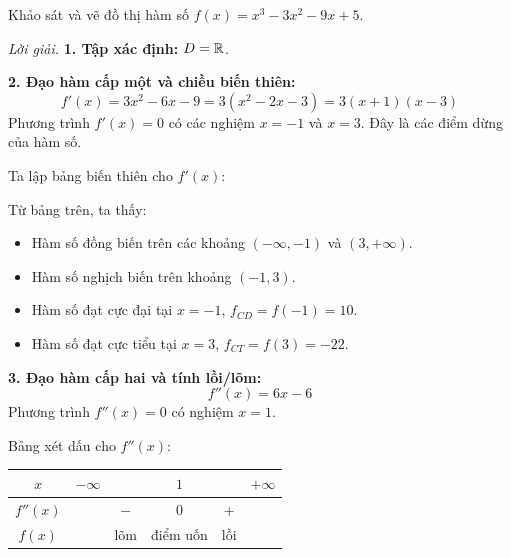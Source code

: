 \begin{example}
Khảo sát và vẽ đồ thị hàm số $f(x) = x^3 - 3x^2 - 9x + 5$.

\textit{Lời giải.}
\textbf{1. Tập xác định:} $D = \mathbb{R}$.

\textbf{2. Đạo hàm cấp một và chiều biến thiên:}
$$ f'(x) = 3x^2 - 6x - 9 = 3(x^2 - 2x - 3) = 3(x+1)(x-3) $$
Phương trình $f'(x)=0$ có các nghiệm $x=-1$ và $x=3$. Đây là các điểm dừng của hàm số.

Ta lập bảng biến thiên cho $f'(x)$:

\begin{center}
\end{center}

Từ bảng trên, ta thấy:
\begin{itemize}
    \item Hàm số đồng biến trên các khoảng $(-\infty, -1)$ và $(3, +\infty)$.
    \item Hàm số nghịch biến trên khoảng $(-1, 3)$.
    \item Hàm số đạt cực đại tại $x=-1$, $f_{CD} = f(-1) = 10$.
    \item Hàm số đạt cực tiểu tại $x=3$, $f_{CT} = f(3) = -22$.
\end{itemize}

\textbf{3. Đạo hàm cấp hai và tính lồi/lõm:}
$$ f''(x) = 6x - 6 $$
Phương trình $f''(x) = 0$ có nghiệm $x=1$.

Bảng xét dấu cho $f''(x)$:
\begin{center}
\begin{tabular}{c|ccccc}
$x$ & $-\infty$ & & $1$ & & $+\infty$ \\
\hline
$f''(x)$ & & $-$ & $0$ & $+$ & \\
\hline
$f(x)$ & & lõm & điểm uốn & lồi & \\
\end{tabular}
\end{center}


\end{example}
